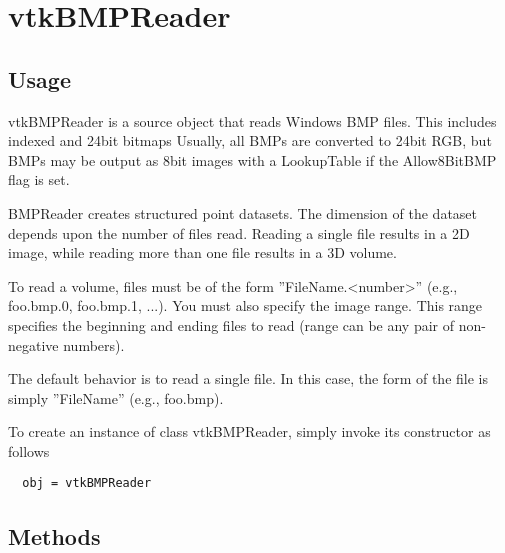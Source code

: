 \section{vtkBMPReader}

\subsection{Usage}

 vtkBMPReader is a source object that reads Windows BMP files.
 This includes indexed and 24bit bitmaps
 Usually, all BMPs are converted to 24bit RGB, but BMPs may be output
 as 8bit images with a LookupTable if the Allow8BitBMP flag is set.

 BMPReader creates structured point datasets. The dimension of the 
 dataset depends upon the number of files read. Reading a single file 
 results in a 2D image, while reading more than one file results in a 
 3D volume.

 To read a volume, files must be of the form ''FileName.<number>''
 (e.g., foo.bmp.0, foo.bmp.1, ...). You must also specify the image 
 range. This range specifies the beginning and ending files to read (range
 can be any pair of non-negative numbers). 

 The default behavior is to read a single file. In this case, the form
 of the file is simply ''FileName'' (e.g., foo.bmp).

To create an instance of class vtkBMPReader, simply
invoke its constructor as follows
\begin{verbatim}
  obj = vtkBMPReader
\end{verbatim}
\subsection{Methods}

